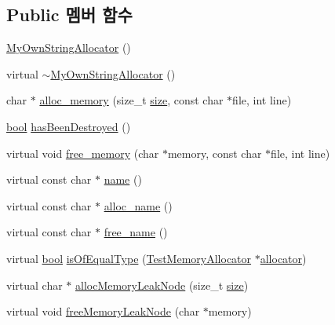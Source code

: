 \subsection*{Public 멤버 함수}
\begin{DoxyCompactItemize}
\item 
\hyperlink{class_my_own_string_allocator_a53efe18dcefad3efc5b372a810a08f03}{My\+Own\+String\+Allocator} ()
\item 
virtual \hyperlink{class_my_own_string_allocator_a66a16460d375bbf6165b24fbe0f22806}{$\sim$\+My\+Own\+String\+Allocator} ()
\item 
char $\ast$ \hyperlink{class_my_own_string_allocator_a96f1e3fb5f11e9df843ddfc1cf50bf98}{alloc\+\_\+memory} (size\+\_\+t \hyperlink{gst__avb__playbin_8c_a439227feff9d7f55384e8780cfc2eb82}{size}, const char $\ast$file, int line)
\item 
\hyperlink{avb__gptp_8h_af6a258d8f3ee5206d682d799316314b1}{bool} \hyperlink{class_test_memory_allocator_ae26c82159ce24eb59770352585b402fd}{has\+Been\+Destroyed} ()
\item 
virtual void \hyperlink{class_test_memory_allocator_a529ac9813d3b0836ce0b964449942534}{free\+\_\+memory} (char $\ast$memory, const char $\ast$file, int line)
\item 
virtual const char $\ast$ \hyperlink{class_test_memory_allocator_a6a96605bec5749750a0b4be6e2d6e721}{name} ()
\item 
virtual const char $\ast$ \hyperlink{class_test_memory_allocator_afab6c44b5468c71a699c1efbd787e6e7}{alloc\+\_\+name} ()
\item 
virtual const char $\ast$ \hyperlink{class_test_memory_allocator_aac134aac79b30bc5903d0b2b7cc55b74}{free\+\_\+name} ()
\item 
virtual \hyperlink{avb__gptp_8h_af6a258d8f3ee5206d682d799316314b1}{bool} \hyperlink{class_test_memory_allocator_a3d6a5cc2f6b7a38b3f1d3e0567bf4f93}{is\+Of\+Equal\+Type} (\hyperlink{class_test_memory_allocator}{Test\+Memory\+Allocator} $\ast$\hyperlink{_memory_leak_warning_test_8cpp_a83fc2e9b9142613f7df2bcc3ff8292bc}{allocator})
\item 
virtual char $\ast$ \hyperlink{class_test_memory_allocator_a1a786ad58b46528e82235a14fa667c1d}{alloc\+Memory\+Leak\+Node} (size\+\_\+t \hyperlink{gst__avb__playbin_8c_a439227feff9d7f55384e8780cfc2eb82}{size})
\item 
virtual void \hyperlink{class_test_memory_allocator_a10f2958f3b7378256e933896ccc93df0}{free\+Memory\+Leak\+Node} (char $\ast$memory)
\end{DoxyCompactItemize}
